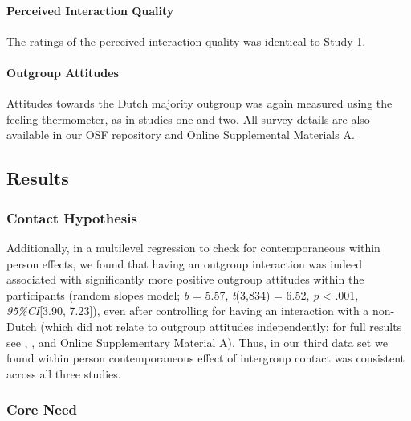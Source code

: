 \paragraph{Perceived Interaction Quality}

The ratings of the perceived interaction quality was identical to Study
1.

\paragraph{Outgroup Attitudes}

Attitudes towards the Dutch majority outgroup was again measured using
the feeling thermometer, as in studies one and two. All survey details
are also available in our OSF repository \citep{KreienkampMasked2022a}
and Online Supplemental Materials A.

\subsection{Results}

\subsubsection{Contact Hypothesis}

Additionally, in a multilevel regression to check for contemporaneous
within person effects, we found that having an outgroup interaction was
indeed associated with significantly more positive outgroup attitudes
within the participants (random slopes model; \textit{b} = 5.57,
\textit{t}(3,834) = 6.52, \textit{p} \textless{} .001,
\textit{95\%CI}{[}3.90, 7.23{]}), even after controlling for having an
interaction with a non-Dutch (which did not relate to outgroup attitudes
independently; for full results see
, ,
and Online Supplementary Material A). Thus, in our third data set we
found within person contemporaneous effect of intergroup contact was
consistent across all three studies.

\subsubsection{Core Need}

